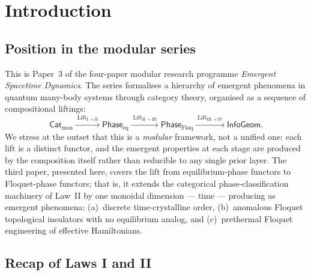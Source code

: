 \documentclass[12pt]{article}
\theoremstyle{definition}
\theoremstyle{remark}
\newcommand{\Phase}{\mathsf{Phase}}
\newcommand{\Cat}{\mathsf{Cat}}
\begin{document}
\tableofcontents
\newpage

\section{Introduction}
\label{sec:intro}

\subsection{Position in the modular series}

This is Paper~3 of the four-paper modular research programme \emph{Emergent Spacetime Dynamics}. The series formalises a hierarchy of emergent phenomena in quantum many-body systems through category theory, organised as a sequence of compositional liftings:
\begin{equation}
\label{eq:lifting-tower}
\Cat_{\mathrm{mon}} \xrightarrow{\;\mathrm{Lift}_{\mathrm{I}\to\mathrm{II}}\;} \Phase_{\mathrm{eq}} \xrightarrow{\;\mathrm{Lift}_{\mathrm{II}\to\mathrm{III}}\;} \Phase_{\mathrm{Floq}} \xrightarrow{\;\mathrm{Lift}_{\mathrm{III}\to\mathrm{IV}}\;} \mathsf{InfoGeom}.
\end{equation}
We stress at the outset that this is a \emph{modular} framework, not a unified one: each lift is a distinct functor, and the emergent properties at each stage are produced by the composition itself rather than reducible to any single prior layer. The third paper, presented here, covers the lift from equilibrium-phase functors to Floquet-phase functors; that is, it extends the categorical phase-classification machinery of Law~II by one monoidal dimension --- time --- producing as emergent phenomena: (a)~discrete time-crystalline order, (b)~anomalous Floquet topological insulators with no equilibrium analog, and (c)~prethermal Floquet engineering of effective Hamiltonians.

\subsection{Recap of Laws I and II}
\end{document}
